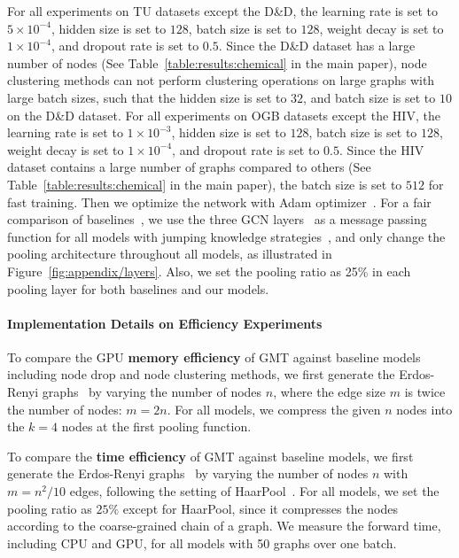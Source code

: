 For all experiments on TU datasets except the D\&D, the learning rate is set to $5\times10^{-4}$, hidden size is set to $128$, batch size is set to $128$, weight decay is set to $1\times10^{-4}$, and dropout rate is set to $0.5$. Since the D\&D dataset has a large number of nodes (See Table~\ref{table:results:chemical} in the main paper), node clustering methods can not perform clustering operations on large graphs with large batch sizes, such that the hidden size is set to $32$, and batch size is set to $10$ on the D\&D dataset. For all experiments on OGB datasets except the HIV, the learning rate is set to $1\times10^{-3}$, hidden size is set to $128$, batch size is set to $128$, weight decay is set to $1\times10^{-4}$, and dropout rate is set to $0.5$. Since the HIV dataset contains a large number of graphs compared to others (See Table~\ref{table:results:chemical} in the main paper), the batch size is set to $512$ for fast training. Then we optimize the network with Adam optimizer~\citep{kingma2014adam}. For a fair comparison of baselines~\citep{SAGPool}, we use the three GCN layers~\citep{GCN} as a message passing function for all models with jumping knowledge strategies~\citep{JumpingKnowledge}, and only change the pooling architecture throughout all models, as illustrated in Figure~\ref{fig:appendix/layers}. Also, we set the pooling ratio as 25\% in each pooling layer for both baselines and our models.

\paragraph{Implementation Details on Efficiency Experiments \label{appendix/classification/efficiency}}
To compare the GPU \textbf{memory efficiency} of GMT against baseline models including node drop and node clustering methods, we first generate the Erdos-Renyi graphs~\citep{randomgraph} by varying the number of nodes $n$, where the edge size $m$ is twice the number of nodes: $m = 2n$. For all models, we compress the given $n$ nodes into the $k=4$ nodes at the first pooling function.

To compare the \textbf{time efficiency} of GMT against baseline models, we first generate the Erdos-Renyi graphs~\citep{randomgraph} by varying the number of nodes $n$ with $m = n^2 / 10$ edges, following the setting of HaarPool~\citep{HaarPool}. For all models, we set the pooling ratio as $25\%$ except for HaarPool, since it compresses the nodes according to the coarse-grained chain of a graph. We measure the forward time, including CPU and GPU, for all models with 50 graphs over one batch.


